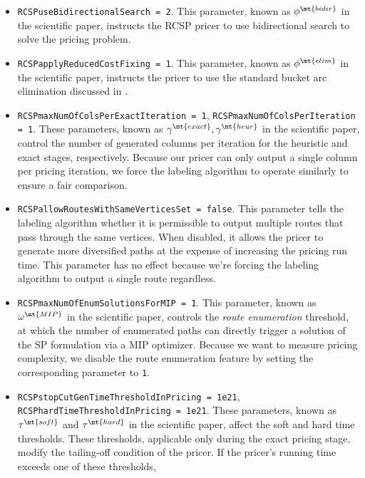 \begin{itemize}
	\item \texttt{RCSPuseBidirectionalSearch = 2}.
	      This parameter, known as $\phi^\mt{bidir}$ in the scientific paper,
	      instructs the RCSP pricer to use bidirectional search to solve the pricing problem.
	\item \texttt{RCSPapplyReducedCostFixing = 1}.
	      This parameter, known as $\phi^\mt{elim}$ in the scientific paper,
	      instructs the pricer to use the standard bucket arc elimination
	      discussed in \textcite{sadykov2021bucket}.
	\item \texttt{RCSPmaxNumOfColsPerExactIteration = 1}, \texttt{RCSPmaxNumOfColsPerIteration = 1}.
	      These parameters, known as $\gamma^\mt{exact}, \gamma^\mt{heur}$  in the scientific paper,
	      control the number of generated columns per iteration for the heuristic and exact stages, respectively.
	      Because our pricer can only output a single column per pricing iteration,
	      we force the labeling algorithm to operate similarly to ensure a fair comparison.
	\item \texttt{RCSPallowRoutesWithSameVerticesSet = false}.
	      This parameter tells the labeling algorithm whether it is permissible
	      to output multiple routes that pass through the same vertices.
	      When disabled, it allows the pricer to generate more diversified paths
	      at the expense of increasing the pricing run time.
	      This parameter has no effect because we're forcing the labeling algorithm
	      to output a single route regardless.
	\item \texttt{RCSPmaxNumOfEnumSolutionsForMIP = 1}.
	      This parameter, known as $\omega^\mt{MIP}$ in the scientific paper,
	      controls the \textit{route enumeration} \parencite{baldacci2008} threshold,
	      at which the number of enumerated paths
	      can directly trigger a solution of the SP formulation via a MIP optimizer.
	      Because we want to measure pricing complexity,
	      we disable the route enumeration feature by setting the corresponding parameter to \texttt{1}.
	\item \texttt{RCSPstopCutGenTimeThresholdInPricing = 1e21}, \texttt{RCSPhardTimeThresholdInPricing = 1e21}.
	      These parameters, known as $\tau^\mt{soft}$ and  $\tau^\mt{hard}$ in the scientific paper,
	      affect the soft and hard time thresholds.
	      These thresholds, applicable only during the exact pricing stage,
	      modify the tailing-off condition of the pricer.
	      If the pricer's running time exceeds one of these thresholds,

\end{itemize}

